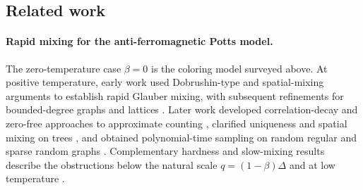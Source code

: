 \documentclass[a4paper,12pt]{article}
\theoremstyle{plain}
\theoremstyle{definition}
\begin{document}
%
%

\subsection{Related work}

\paragraph{Rapid mixing for the anti-ferromagnetic Potts model.}
The zero-temperature case $\beta=0$ is the coloring model surveyed above.
At positive temperature, early work used Dobrushin-type and spatial-mixing
arguments to establish rapid Glauber mixing, with subsequent refinements
for bounded-degree graphs and lattices
\cite{SalasSokal1997,GoldbergEtAl2006Potts}.  Later work developed
correlation-decay and zero-free approaches to approximate counting
\cite{YinZhang2015SpatialPotts,BencsBerrekkalRegts2026Counting,
LiuSinclairSrivastava2025Potts}, clarified uniqueness and spatial mixing on
trees \cite{GalanisGoldbergYang2018,deBoerBuysRegts2023,BencsEtAl2023Potts,
CLMM2023,BencsBerrekkalRegts2025}, and obtained polynomial-time sampling on
random regular and sparse random graphs
\cite{BlancaEtAl2020Potts,YinZhang2016Potts,Efthymiou2022Potts}.
Complementary hardness and slow-mixing results describe the obstructions
below the natural scale $q=(1-\beta)\Delta$ and at low temperature
\cite{GalanisStefankovicVigoda2015,LiLiuYang2026Potts}.
\end{document}
